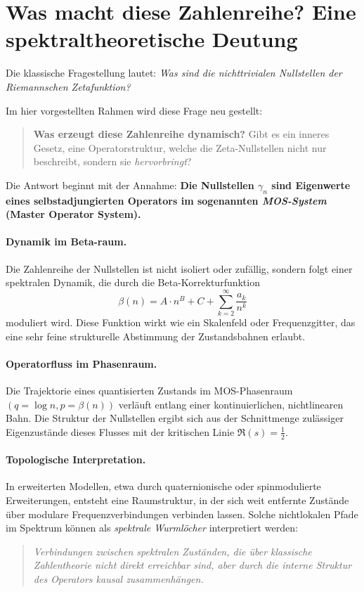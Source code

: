 \section*{Was macht diese Zahlenreihe? Eine spektraltheoretische Deutung}

Die klassische Fragestellung lautet:  
\textit{Was sind die nichttrivialen Nullstellen der Riemannschen Zetafunktion?}

Im hier vorgestellten Rahmen wird diese Frage neu gestellt:
\begin{quote}
    \textbf{Was erzeugt diese Zahlenreihe dynamisch?} Gibt es ein inneres Gesetz, eine Operatorstruktur, welche die Zeta-Nullstellen nicht nur beschreibt, sondern sie \emph{hervorbringt}?
\end{quote}

Die Antwort beginnt mit der Annahme:  
\textbf{Die Nullstellen $\gamma_n$ sind Eigenwerte eines selbstadjungierten Operators im sogenannten \textit{MOS-System} (Master Operator System).}

\paragraph{Dynamik im Beta-raum.}
Die Zahlenreihe der Nullstellen ist nicht isoliert oder zufällig, sondern folgt einer spektralen Dynamik, die durch die Beta-Korrekturfunktion
\[
\beta(n) = A \cdot n^B + C + \sum_{k=2}^{\infty} \frac{a_k}{n^k}
\]
moduliert wird. Diese Funktion wirkt wie ein Skalenfeld oder Frequenzgitter, das eine sehr feine strukturelle Abstimmung der Zustandsbahnen erlaubt.

\paragraph{Operatorfluss im Phasenraum.}
Die Trajektorie eines quantisierten Zustands im MOS-Phasenraum $(q = \log n, p = \beta(n))$ verläuft entlang einer kontinuierlichen, nichtlinearen Bahn. Die Struktur der Nullstellen ergibt sich aus der Schnittmenge zulässiger Eigenzustände dieses Flusses mit der kritischen Linie $\Re(s) = \frac{1}{2}$.

\paragraph{Topologische Interpretation.}
In erweiterten Modellen, etwa durch quaternionische oder spinmodulierte Erweiterungen, entsteht eine Raumstruktur, in der sich weit entfernte Zustände über modulare Frequenzverbindungen verbinden lassen. Solche nichtlokalen Pfade im Spektrum können als \emph{spektrale Wurmlöcher} interpretiert werden:
\begin{quote}
    \emph{Verbindungen zwischen spektralen Zuständen, die über klassische Zahlentheorie nicht direkt erreichbar sind, aber durch die interne Struktur des Operators kausal zusammenhängen.}
\end{quote}

